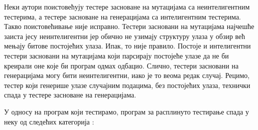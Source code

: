 \documentclass[12pt,oneside]{memoir}
\begin{document}
Неки аутори поистовећују тестере засноване на мутацијама са неинтелигентним тестерима, а тестере засноване на генерацијама са интелигентним тестерима. Такво поистовећивање није исправно. Тестери засновани на мутацијама најчешће заиста јесу неинтелигентни јер обично не узимају структуру улаза у обзир 
већ мењају битове постојећих улаза. Ипак, то није правило. Постоје и интелигентни тестери засновани на мутацијама који парсирају постојеће улазе да не би креирали оне које би програм одмах одбацио.
Слично, тестери засновани на генерацијама могу бити неинтелигентни, иако је то веома редак случај. Рецимо, тестер који генерише улазе случајним подацима, без постојећих улаза, технички спада у тестере засноване на генерацијама. 


У односу на програм који тестирамо, програм за расплинуто тестирање спада у неку од следећих категорија \cite{fuzzingBrute, fuzzing}:
\end{document}
